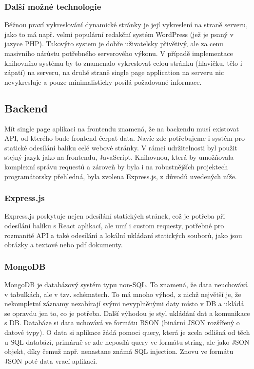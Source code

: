 \subsubsection{Další možné technologie}
Běžnou praxí vykreslování dynamické stránky je její vykreslení na straně serveru,
jako to má např. velmi populární redakční systém WordPress (jež je psaný v jazyce PHP).
Takovýto system je dobře uživatelsky přivětivý, ale za cenu masivního nárůstu
potřebného serverového výkonu.
V případě implementace knihovního systému by to znamenalo vykreslovat
celou stránku (hlavičku, tělo i zápatí) na serveru,
na druhé straně single page application na serveru nic nevykresluje a
pouze minimalisticky posílá požadované informace.


\subsection{Backend}
Mít single page aplikaci na frontendu znamená, že na backendu musí existovat API,
od kterého bude frontend čerpat data.
Navíc zde potřebujeme i systém pro statické odesílání balíku celé webové stránky.
V rámci udržitelnosti byl použit stejný jazyk jako na frontendu, JavaScript.
Knihovnou, která by umožňovala komplexní správu requestů a zároveň by byla
i na robustnějších projektech programátorsky přehledná, byla zvolena Express.js,
z důvodů uvedených níže.

\subsubsection{Express.js}
Express.js poskytuje nejen odesílání statických stránek,
což je potřeba při odesílání balíku s React aplikací, ale umí i
custom requesty, potřebné pro rozmanité API a také odesílání a
lokální ukládaní statických souborů, jako jsou obrázky a textové nebo pdf dokumenty.

\subsubsection{MongoDB}
MongoDB je databázový systém typu non-SQL.
To znamená, že data neuchovává v tabulkách, ale v tzv. schématech.
To má mnoho výhod, z nichž největší je, že nekompletní záznamy nezabírají
svými nevyplněnými daty místo v DB a ukládá se opravdu jen to, co je potřeba.
Další výhodou je styl ukládání dat a komunikace s DB.
Databáze si data uchovává ve formátu BSON (binární JSON rozšířený o datové typy).
O data si aplikace žádá pomoci query,
která je zcela odlišná od těch u SQL databází,
primárně se zde neposílá query ve formátu string, ale jako JSON objekt,
díky čemuž např. nenastane známá SQL injection.
Znovu ve formátu JSON poté data vrací aplikaci.

